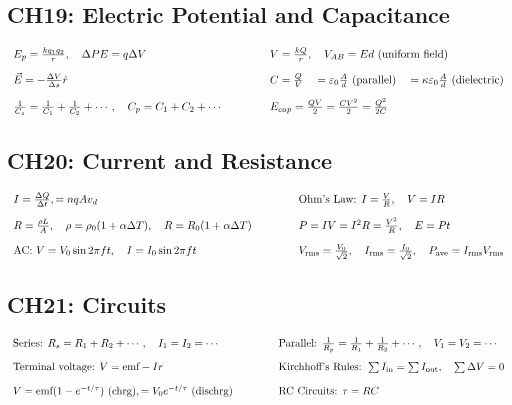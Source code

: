 \documentclass[12pt,a4paper]{article}
\begin{document}
\subsection{CH19: Electric Potential and Capacitance}
\begin{align*}
\begin{array}{l@{\hspace{1.5cm}}l}
E_p = \frac{kq_1 q_2}{r}, \quad \Delta PE = q\Delta V & V = \frac{kQ}{r}, \quad V_{AB} = Ed \text{ (uniform field)} \\[1em]
\vec{E} = -\frac{\Delta V}{\Delta s}\hat{r} & C = \frac{Q}{V}\quad = \varepsilon_0\frac{A}{d} \text{ (parallel)}\quad = \kappa\varepsilon_0\frac{A}{d} \text{ (dielectric)} \\[1em]
\frac{1}{C_s} = \frac{1}{C_1} + \frac{1}{C_2} + \cdots, \quad C_p = C_1 + C_2 + \cdots & E_{cap} = \frac{QV}{2} = \frac{CV^2}{2} = \frac{Q^2}{2C}
\end{array}
\end{align*}


\subsection{CH20: Current and Resistance}
\begin{align*}
\begin{array}{l@{\hspace{1.5cm}}l}
I = \frac{\Delta Q}{\Delta t}, = nqAv_d & \text{Ohm's Law: } I = \frac{V}{R}, \quad V = IR \\[1em]
R = \frac{\rho L}{A}, \quad \rho = \rho_0(1+\alpha \Delta T), \quad R = R_0(1+\alpha \Delta T) & P = IV = I^2R = \frac{V^2}{R}, \quad E = Pt \\[1em]
\text{AC: } V = V_0\sin 2\pi ft, \quad I = I_0\sin 2\pi ft & V_{\text{rms}} = \frac{V_0}{\sqrt{2}}, \quad I_{\text{rms}} = \frac{I_0}{\sqrt{2}}, \quad P_{\text{ave}} = I_{\text{rms}}V_{\text{rms}}
\end{array}
\end{align*}

\subsection{CH21: Circuits}
\begin{align*}
\begin{array}{l@{\hspace{1.5cm}}l}
\text{Series: } R_s = R_1 + R_2 + \cdots, \quad I_1 = I_2 = \cdots & \text{Parallel: } \frac{1}{R_p} = \frac{1}{R_1} + \frac{1}{R_2} + \cdots, \quad V_1 = V_2 = \cdots \\[1em]
\text{Terminal voltage: } V = \text{emf} - Ir & \text{Kirchhoff's Rules: } \sum I_{\text{in}} = \sum I_{\text{out}}, \quad \sum \Delta V = 0 \\[1em]
 V = \text{emf}(1-e^{-t/\tau}) \text{ (chrg)}, = V_0 e^{-t/\tau} \text{ (dischrg)} & \text{RC Circuits: } \tau = RC 
\end{array}
\end{align*}
\end{document}
